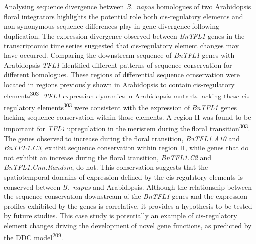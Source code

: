 \documentclass[12pt,]{book}
\begin{document}
Analysing sequence divergence between \emph{B.~napus} homologues of two
Arabidopsis floral integrators highlights the potential role both
cis-regulatory elements and non-synonymous sequence differences play in
gene divergence following duplication. The expression divergence
observed between \emph{BnTFL1} genes in the transcriptomic time series
suggested that cis-regulatory element changes may have occurred.
Comparing the downstream sequence of \emph{BnTFL1} genes with
Arabidopsis \emph{TFL1} identified different patterns of sequence
conservation for different homologues. These regions of differential
sequence conservation were located in regions previously shown in
Arabidopsis to contain cis-regulatory elements\textsuperscript{303}.
\emph{TFL1} expression dynamics in Arabidopsis mutants lacking these
cis-regulatory elements\textsuperscript{303} were consistent with the
expression of \emph{BnTFL1} genes lacking sequence conservation within
those elements. A region II was found to be important for \emph{TFL1}
upregulation in the meristem during the floral
transition\textsuperscript{303}. The genes observed to increase during
the floral transition, \emph{BnTFL1.A10} and \emph{BnTFL1.C3}, exhibit
sequence conservation within region II, while genes that do not exhibit
an increase during the floral transition, \emph{BnTFL1.C2} and
\emph{BnTFL1.Cnn.Random}, do not. This conservation suggests that the
spatiotemporal domains of expression defined by the cis-regulatory
elements is conserved between \emph{B.~napus} and Arabidopsis. Although
the relationship between the sequence conservation downstream of the
\emph{BnTFL1} genes and the expression profiles exhibited by the genes
is correlative, it provides a hypothesis to be tested by future studies.
This case study is potentially an example of cis-regulatory element
changes driving the development of novel gene functions, as predicted by
the DDC model\textsuperscript{209}.
\end{document}
